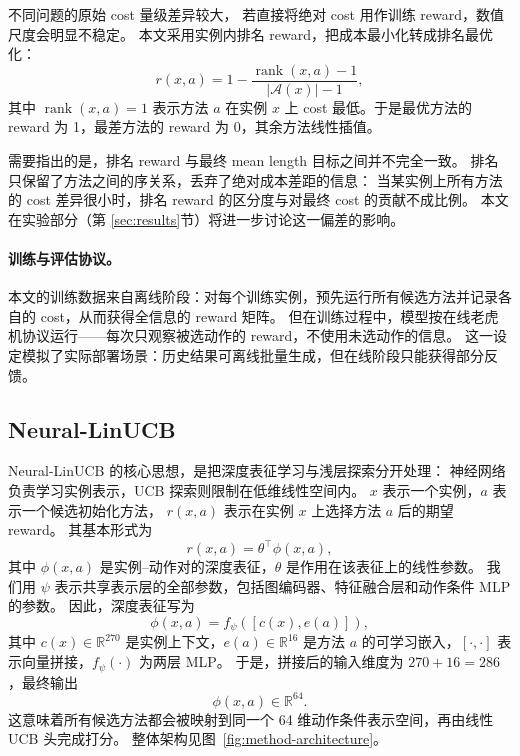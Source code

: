 不同问题的原始 cost 量级差异较大，
若直接将绝对 cost 用作训练 reward，数值尺度会明显不稳定。
本文采用实例内排名 reward，把成本最小化转成排名最优化：
\begin{equation}
  r(x, a) = 1 - \frac{\operatorname{rank}(x, a) - 1}{|\mathcal{A}(x)| - 1},
  \label{eq:rank-reward}
\end{equation}
其中 $\operatorname{rank}(x, a)=1$ 表示方法 $a$ 在实例 $x$ 上 cost 最低。于是最优方法的 reward 为 1，最差方法的 reward 为 0，其余方法线性插值。

需要指出的是，排名 reward 与最终 mean length 目标之间并不完全一致。
排名只保留了方法之间的序关系，丢弃了绝对成本差距的信息：
当某实例上所有方法的 cost 差异很小时，排名 reward 的区分度与对最终 cost 的贡献不成比例。
本文在实验部分（第 \ref{sec:results}节）将进一步讨论这一偏差的影响。

\paragraph{训练与评估协议。}
本文的训练数据来自离线阶段：对每个训练实例，预先运行所有候选方法并记录各自的 cost，从而获得全信息的 reward 矩阵。
但在训练过程中，模型按在线老虎机协议运行——每次只观察被选动作的 reward，不使用未选动作的信息。
这一设定模拟了实际部署场景：历史结果可离线批量生成，但在线阶段只能获得部分反馈。

\subsection{Neural-LinUCB}

Neural-LinUCB 的核心思想，是把深度表征学习与浅层探索分开处理：
神经网络负责学习实例表示，UCB 探索则限制在低维线性空间内\cite{xu2022neurallinucb}。
$x$ 表示一个实例，$a$ 表示一个候选初始化方法，
$r(x,a)$ 表示在实例 $x$ 上选择方法 $a$ 后的期望 reward。
其基本形式为
\begin{equation}
  r(x,a)=\theta^\top \phi(x,a),
\end{equation}
其中 $\phi(x,a)$ 是实例--动作对的深度表征，$\theta$ 是作用在该表征上的线性参数。
我们用 $\psi$ 表示共享表示层的全部参数，包括图编码器、特征融合层和动作条件 MLP 的参数。
因此，深度表征写为
\begin{equation}
  \phi(x, a) = f_\psi([c(x), e(a)]),
  \label{eq:phi}
\end{equation}
其中 $c(x) \in \mathbb{R}^{270}$ 是实例上下文，$e(a) \in \mathbb{R}^{16}$ 是方法 $a$ 的可学习嵌入，$[\cdot,\cdot]$ 表示向量拼接，$f_\psi(\cdot)$ 为两层 MLP。
于是，拼接后的输入维度为 $270 + 16 = 286$，最终输出
\[
  \phi(x,a) \in \mathbb{R}^{64}.
\]
这意味着所有候选方法都会被映射到同一个 64 维动作条件表示空间，再由线性 UCB 头完成打分。
整体架构见图~\ref{fig:method-architecture}。

